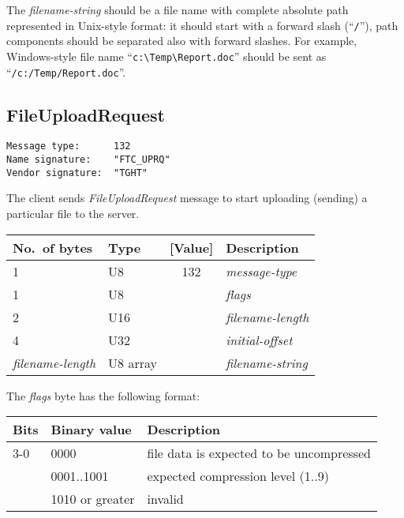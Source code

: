 \documentclass[a4paper]{article}
\newcommand{\typestr}[1]{\textit{#1}}
\begin{document}

The \typestr{filename-string} should be a file name with complete
absolute path represented in Unix-style format: it should start with a
forward slash (``\verb|/|''), path components should be separated also
with forward slashes. For example, Windows-style file name
``\verb|c:\Temp\Report.doc|'' should be sent as
``\verb|/c:/Temp/Report.doc|''.

\newpage
\subsection{FileUploadRequest}
\begin{verbatim}
Message type:      132
Name signature:    "FTC_UPRQ"
Vendor signature:  "TGHT"
\end{verbatim}

The client sends \typestr{FileUploadRequest} message to start
uploading (sending) a particular file to the server.

\begin{tabular}{l|lc|l} \hline
No.\ of bytes & Type & [Value] & Description \\ \hline
1 & U8  & 132 & \typestr{message-type} \\
1 & U8  &     & \typestr{flags} \\
2 & U16 &     & \typestr{filename-length} \\
4 & U32 &     & \typestr{initial-offset} \\
\typestr{filename-length} & U8 array & & \typestr{filename-string} \\
\hline\end{tabular}

The \typestr{flags} byte has the following format:

\begin{tabular}{l|l|l}
\hline
Bits & Binary value   & Description \\ \hline
3-0 & 0000            & file data is expected to be uncompressed \\
    & 0001..1001      & expected compression level (1..9) \\
    & 1010 or greater & invalid \\
\hline
\end{tabular}

\end{document}
